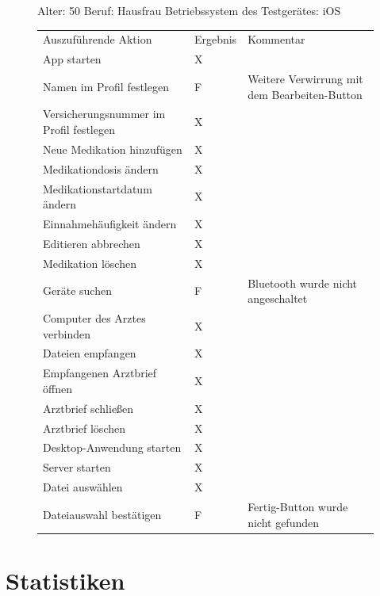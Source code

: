 \documentclass[a4paper]{scrreprt}
\begin{document}
 \begin{figure}
 
   Alter: 50 \newline
Beruf: Hausfrau \newline
Betriebssystem des Testgerätes: iOS \newline \newline
 \begin{tabular}{ |l|l| p{6cm} }
  Auszuführende Aktion & Ergebnis & Kommentar \\
App starten & X & \\
Namen im Profil festlegen & F & Weitere Verwirrung mit dem Bearbeiten-Button \\
Versicherungsnummer im Profil festlegen & X & \\
Neue Medikation hinzufügen & X & \\
Medikationdosis ändern & X & \\
Medikationstartdatum ändern & X & \\
Einnahmehäufigkeit ändern & X & \\
Editieren abbrechen & X & \\
Medikation löschen & X & \\
Geräte suchen & F & Bluetooth wurde nicht angeschaltet \\
Computer des Arztes verbinden & X & \\
Dateien empfangen & X & \\
Empfangenen Arztbrief öffnen & X & \\
Arztbrief schließen & X & \\
Arztbrief löschen & X & \\
Desktop-Anwendung starten & X & \\
Server starten & X & \\
Datei auswählen & X & \\
Dateiauswahl bestätigen & F & Fertig-Button wurde nicht gefunden \\
 \end{tabular}
\end{figure}
\section{Statistiken}

\printnoidxglossaries

\listoffigures
 
\end{document}
